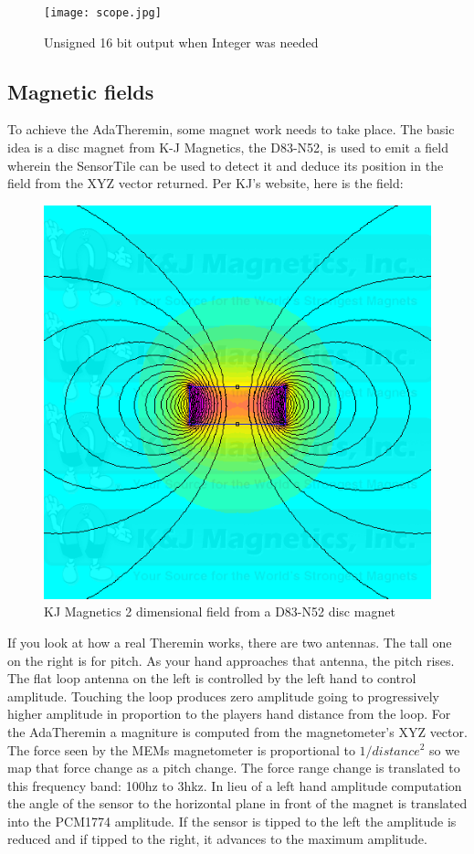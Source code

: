 \documentclass[11pt]{article}
\numberwithin{figure}{section}
\begin{document}
\begin{figure}[H] %
\centering
\texttt{[image: scope.jpg]}
\caption{Unsigned 16 bit output when Integer was needed}
\label{Figure:Scope}
\end{figure}

\subsection{Magnetic fields}
To achieve the AdaTheremin, some magnet work needs to take place. The
basic idea is a disc magnet from K-J Magnetics, the D83-N52, is used
to emit a field wherein the SensorTile can be used to detect it and
deduce its position in the field from the XYZ vector returned. Per
KJ's website, here is the field:

\begin{figure}[H] %
\centering
\includegraphics[scale=0.5]{D83-N52.png}
\caption{KJ Magnetics 2 dimensional field from a D83-N52 disc magnet}
\label{Figure:D83-N52}
\end{figure}

If you look at how a real Theremin works, there are two antennas. The
tall one on the right is for pitch. As your hand approaches that
antenna, the pitch rises. The flat loop antenna on the left is
controlled by the left hand to control amplitude. Touching the loop
produces zero amplitude going to progressively higher amplitude in
proportion to the players hand distance from the loop. For the
AdaTheremin a magniture is computed from the magnetometer's XYZ
vector. The force seen by the MEMs magnetometer is proportional to $1
/ distance^2$ so we map that force change as a pitch change.  The
force range change is translated to this frequency band: 100hz to
3hkz. In lieu of a left hand amplitude computation the angle of the
sensor to the horizontal plane in front of the magnet is translated
into the PCM1774 amplitude. If the sensor is tipped to the left the
amplitude is reduced and if tipped to the right, it advances to the
maximum amplitude.
\end{document}
